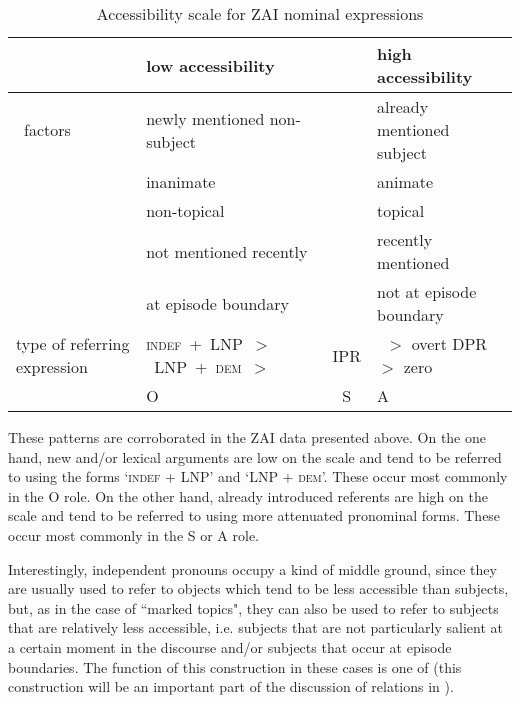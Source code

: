 \begin{table}
\small
\begin{tabularx}{\textwidth}{Ql@{}c@{}l}
\lsptoprule
   
&   \textbf{low accessibility}  &  &  \textbf{high accessibility}  \\
  
 
\midrule 

\mbox{ factors} &  newly mentioned non-subject  &   & already mentioned  subject  \\
 
		      &    inanimate  &  & animate  \\
		      &     non-topical  &   & topical  \\
		      &      not mentioned recently  &  & recently mentioned   \\
		      &      at episode boundary  &   & not at episode boundary \\
       
  
\midrule
 
type of referring expression & \mbox{\textsc{indef}  + LNP $>$ LNP + \textsc{dem}  $>$} &    IPR   &~$>$  overt DPR $>$ zero \\
 

 
\midrule 
   & \hfill O \hfill &  S &\hfill A \hfill\\ 
\midrule

\end{tabularx}
\caption{{Accessibility scale for ZAI nominal expressions}}
\label{accessibilityscale}

\end{table}
 
These patterns are corroborated in the ZAI data presented above. On the one hand, new and/or lexical arguments are low on the  scale and tend to be referred to using the forms `\textsc{indef}  + LNP' and `LNP + \textsc{dem}'. These occur most commonly in the O role. On the other hand, already introduced referents are high on the  scale and tend to be referred to using more attenuated pronominal forms. These occur most commonly in the S or A role. 

Interestingly, independent pronouns occupy a kind of middle ground, since they are usually used to refer to objects which tend to be less accessible than subjects, but, as in the case of ``marked topics", they can also be used to refer to subjects that are relatively less accessible, i.e. subjects that are not particularly salient at a certain moment in the discourse and/or subjects that occur at episode boundaries. The function of this construction in these cases is one of  (this construction will be an important part of the discussion of  relations in ).

